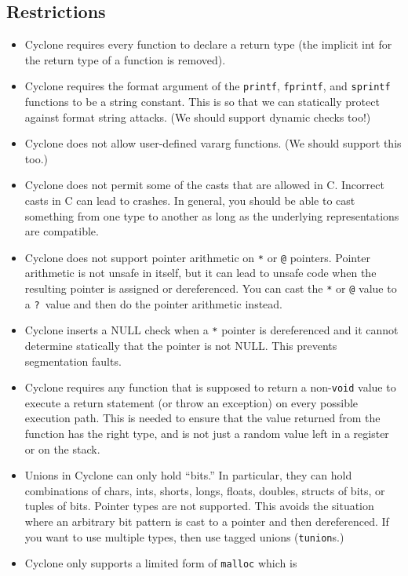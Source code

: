 \subsection{Restrictions}
\begin{itemize}
\item Cyclone requires every function to declare a return type (the
  implicit int for the return type of a function is removed).
\item Cyclone requires the format argument of the \texttt{printf},
  \texttt{fprintf}, and \texttt{sprintf} functions to be a string
  constant.  This is so that we can statically protect against format
  string attacks.  (We should support dynamic checks too!)
\item Cyclone does not allow user-defined vararg functions. (We should
  support this too.)
\item Cyclone does not permit some of the casts that are allowed in C\@.
  Incorrect casts in C can lead to crashes.  In general, you should be
  able to cast something from one type to another as long as the
  underlying representations are compatible.
\item Cyclone does not support pointer arithmetic on \texttt{*} or
  \texttt{@} pointers.  Pointer arithmetic is not unsafe in itself, but
  it can lead to unsafe code when the resulting pointer is assigned or
  dereferenced.  You can cast the \texttt{*} or \texttt{@} value to a
  \texttt{?}\ value and then do the pointer arithmetic instead.
\item Cyclone inserts a NULL check when a \texttt{*} pointer is
  dereferenced and it cannot determine statically that the pointer is
  not NULL\@.  This prevents segmentation faults.
\item Cyclone requires any function that is supposed to return a
  non-\texttt{void} value to execute a return statement (or throw an
  exception) on every possible execution path. This is needed to
  ensure that the value returned from the function has the right type,
  and is not just a random value left in a register or on the stack.
\item Unions in Cyclone can only hold ``bits.''  In particular, they
  can hold combinations of chars, ints, shorts, longs, floats,
  doubles, structs of bits, or tuples of bits. Pointer types are not
  supported.  This avoids the situation where an arbitrary bit pattern
  is cast to a pointer and then dereferenced. If you want to use
  multiple types, then use tagged unions (\texttt{tunion}s.)
\item Cyclone only supports a limited form of \texttt{malloc} which is

\end{itemize}
